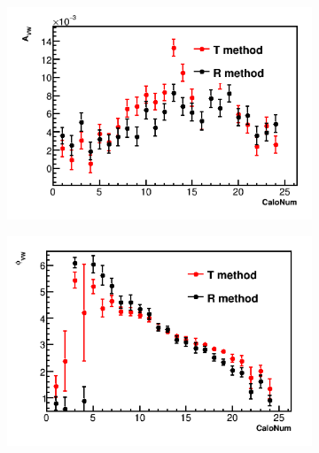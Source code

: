\documentclass[12pt,letterpaper]{article}
\begin{document}
\begin{figure}[]
\centering
    \begin{subfigure}[t]{0.45\textwidth}
        \centering
        \includegraphics[width=\textwidth]{9d_noTimeRand_Avw_Compared}
        \caption{}
    \end{subfigure}%
    \begin{subfigure}[t]{0.45\textwidth}
        \centering
        \includegraphics[width=\textwidth]{9d_noTimeRand_Phivw_Compared}
        \caption{}
    \end{subfigure}


\end{figure}
\end{document}
